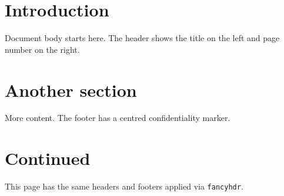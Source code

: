 \documentclass{article}
\begin{document}
\section{Introduction}
Document body starts here. The header shows the title on the left and page number on the right.

\section{Another section}
More content. The footer has a centred confidentiality marker.

\newpage

\section{Continued}
This page has the same headers and footers applied via \texttt{fancyhdr}.
\end{document}
